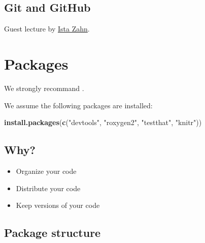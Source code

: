 \documentclass[]{book}
\newenvironment{Shaded}{\begin{snugshade}}{\end{snugshade}}
\newcommand{\KeywordTok}[1]{\textcolor[rgb]{0.13,0.29,0.53}{\textbf{#1}}}
\newcommand{\StringTok}[1]{\textcolor[rgb]{0.31,0.60,0.02}{#1}}
\newcommand{\NormalTok}[1]{#1}
\theoremstyle{definition}
\theoremstyle{definition}
\theoremstyle{definition}
\theoremstyle{remark}
\begin{document}
\section{Git and GitHub}\label{git-and-github}

Guest lecture by \href{https://www.iq.harvard.edu/people/ista-zahn}{Ista
Zahn}.

\chapter{Packages}\label{packages}

We strongly recommand \citet{Wickham2015}.

We assume the following packages are installed:

\begin{Shaded}
\begin{Highlighting}[]
\KeywordTok{install.packages}\NormalTok{(}\KeywordTok{c}\NormalTok{(}\StringTok{"devtools"}\NormalTok{, }\StringTok{"roxygen2"}\NormalTok{, }\StringTok{"testthat"}\NormalTok{, }\StringTok{"knitr"}\NormalTok{))}
\end{Highlighting}
\end{Shaded}

\section{Why?}\label{why}

\begin{itemize}
\item
  Organize your code
\item
  Distribute your code
\item
  Keep versions of your code
\end{itemize}

\section{Package structure}\label{package-structure}
\end{document}
